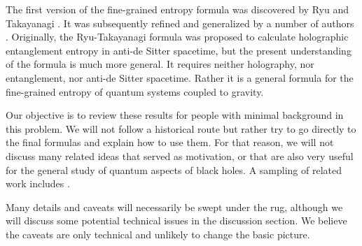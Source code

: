   


The first version of the fine-grained entropy formula was discovered by Ryu and Takayanagi \cite{Ryu:2006bv}. It was subsequently refined and generalized by a number of authors \cite{Hubeny:2007xt,Lewkowycz:2013nqa,Barrella:2013wja,Faulkner:2013ana,Engelhardt:2014gca,Almheiri:2019psf,Penington:2019npb,Almheiri:2019hni}. Originally, the Ryu-Takayanagi formula was proposed to calculate holographic entanglement entropy in anti-de Sitter spacetime, but the present understanding of the formula is much more general. It requires neither holography, nor entanglement, nor anti-de Sitter spacetime. Rather it is a general formula for the fine-grained entropy of quantum systems coupled to gravity.
  
  
    
  Our objective is to review these results for people with minimal background in this problem. We will not follow a historical route but rather try to go directly to the final formulas and explain how to use them. For that reason,  we will not discuss many related ideas that served as motivation, or that are also very useful for the general study of quantum aspects of black holes. A sampling of related work includes  \cite{Zhao:2019nxk, Akers:2019nfi, Rozali:2019day, Chen:2019uhq, Bousso:2019ykv, Almheiri:2019psy, Chen:2019iro, Laddha:2020kvp, Mousatov:2020ics, Kim:2020cds, Saraswat:2020zzf, Chen:2020wiq, Marolf:2020xie, Verlinde:2020upt, Giddings:2020yes, Liu:2020gnp, Pollack:2020gfa, Balasubramanian:2020hfs, Gautason:2020tmk,Anegawa:2020ezn, Hollowood:2020cou, Krishnan:2020oun, Banks:2020zrt, Geng:2020qvw}.   

Many details and caveats will necessarily be swept under the rug, although we will discuss some potential technical issues in the discussion section. We believe the caveats are only technical and unlikely to change the basic picture.
 
 
